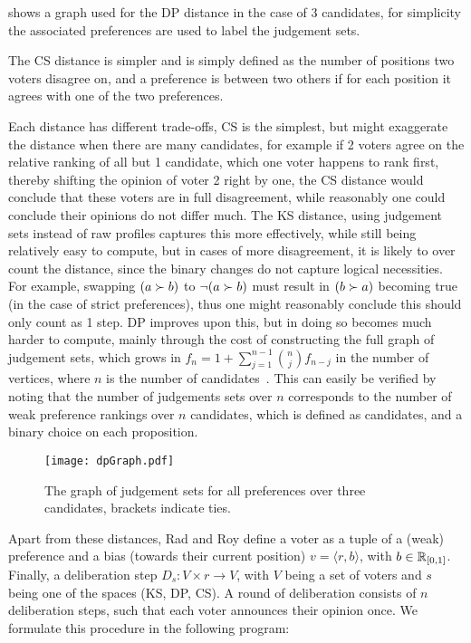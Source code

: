  shows a graph used for the DP distance in the case of
3 candidates, for simplicity the associated preferences are used to label the
judgement sets.


The CS distance is simpler and is simply defined as the number of positions two
voters disagree on, and a preference is between two others if for each position
it agrees with one of the two preferences.

Each distance has different trade-offs, CS is the simplest, but might
exaggerate the distance when there are many candidates, for example if 2
voters agree on the relative ranking of all but 1 candidate, which one voter
happens to rank first, thereby shifting the opinion of voter 2 right by one,
the CS distance would conclude that these voters are in full disagreement,
while reasonably one could conclude their opinions do not differ much. The KS
distance, using judgement sets instead of raw profiles captures this more
effectively, while still being relatively easy to compute, but in cases of more
disagreement, it is likely to over count the distance, since the binary changes
do not capture logical necessities. For example, swapping $( a \succ b)$ to
$\neg (a \succ b)$ must result in $(b \succ a)$ becoming true (in the case of
strict preferences), thus one might reasonably conclude this should only count
as 1 step. DP improves upon this, but in doing so becomes much harder to
compute, mainly through the cost of constructing the full graph of judgement
sets, which grows in $f_n = 1 + \sum_{j=1}^{n-1} \binom{n}{j} f_{n-j}$ in the
number of vertices, where $n$ is the number of candidates~\cite{grossPreferentialArrangements1962}. This can easily be
verified by noting that the number of judgements sets over $n$ corresponds to
the number of weak preference rankings over $n$ candidates, which is defined
as candidates, and a binary choice on each proposition.



\vspace{1em}
\begin{figure}[ht]
	\centering
	\texttt{[image: dpGraph.pdf]}
	\caption{The graph of judgement sets for all preferences over three candidates, brackets indicate ties.}
	\label{figure:DPDistance}
\end{figure}


Apart from these distances, Rad and Roy define a voter as a tuple of a (weak)
preference and a bias (towards their current position) \(v = \langle r, b
\rangle\), with \( b \in \mathbb{R}_{[0,1]}\). Finally, a deliberation step \(D_{s}
: V \times r \to V\), with $V$ being a set of voters and $s$ being one of the
spaces (KS, DP, CS). A round of deliberation consists of $n$ deliberation
steps, such that each voter announces their opinion once. We formulate this
procedure in the following program:

